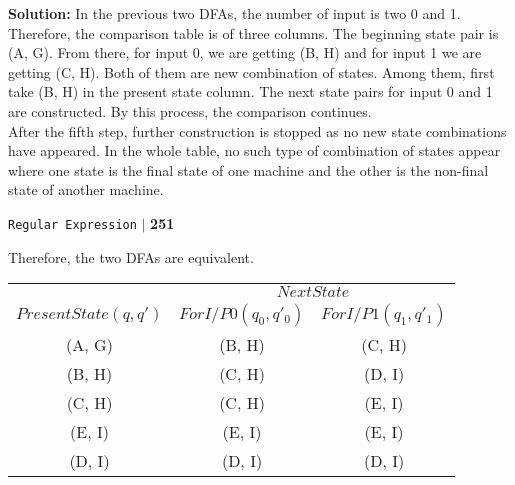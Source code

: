 \documentclass{article}
\begin{document}
\textbf{Solution:}  In the previous two DFAs, the number of input is two 0 and 1. Therefore, the comparison
table is of three columns. The beginning state pair is (A, G). From there, for input 0, we are getting
(B, H) and for input 1 we are getting (C, H). Both of them are new combination of states. Among them,
first take (B, H) in the present state column. The next state pairs for input 0 and 1 are constructed. By
this process, the comparison continues.\\
\hspace*{0.5cm} After the fifth step, further construction is stopped as no new state combinations have appeared. In
the whole table, no such type of combination of states appear where one state is the final state of one
machine and the other is the non-final state of another machine.\\

\newpage
\begin{flushright}
 \texttt{Regular Expression} \hspace*{0.1cm}\textbf{$|$} \hspace*{0.1cm} \textbf{251}\hspace*{0.1cm}
\end{flushright}
\vspace*{0.5cm}

Therefore, the two DFAs are equivalent.\\

\begin{center}
\begin{tabular}{ccc}
 \hline

 \hline

 \hline

 \hline
 & \multicolumn{2}{c}{$Next State$}\\
 \cline{2-3}
 $Present State (q, q')$ &  $For I/P 0 (q_0, q'_0)$ & $For I/P 1 (q_1, q'_1)$\\
\hline
(A, G) & (B, H) & (C, H)\\
(B, H) & (C, H) & (D, I)\\
(C, H) & (C, H) & (E, I)\\
(E, I) & (E, I) & (E, I)\\
(D, I) & (D, I) & (D, I)\\
 \hline

 \hline

 \hline

 \hline
\end{tabular}
\end{center}
\end{document}
